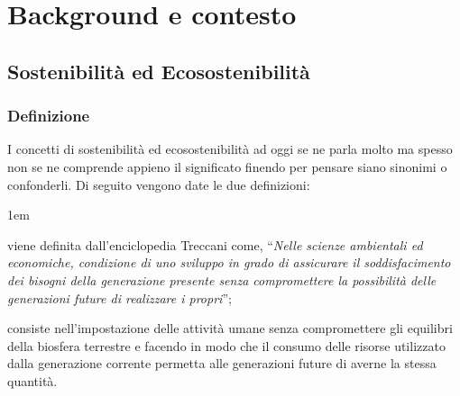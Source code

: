 \chapter{Background e contesto}
%
\section{Sostenibilità ed Ecosostenibilità}
\subsection{Definizione}
I concetti di sostenibilità ed ecosostenibilità ad oggi se ne parla molto ma spesso non se ne comprende appieno il significato finendo per pensare siano sinonimi o confonderli. Di seguito vengono date le due definizioni:
\begin{description}
    \itemsep1em
    \item [Sostenibilità] viene definita dall'enciclopedia Treccani \cite{treccaniEnc} come, \enquote{\textit{Nelle scienze ambientali ed economiche, condizione di uno sviluppo in grado di assicurare il soddisfacimento dei bisogni della generazione presente senza compromettere la possibilità delle generazioni future di realizzare i propri}};
    \item [Ecosostenibilità] consiste nell'impostazione delle attività umane senza compromettere gli equilibri della biosfera terrestre e facendo in modo che il consumo delle risorse utilizzato dalla generazione corrente permetta alle generazioni future di averne la stessa quantità.
\end{description}

